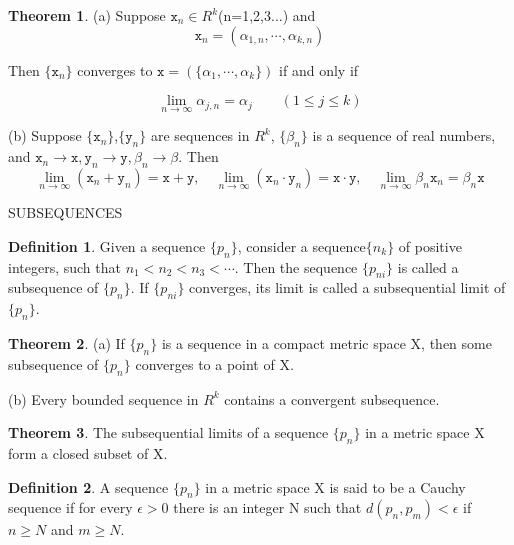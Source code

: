 \documentclass{article}
\theoremstyle{definition}
\newtheorem{defi}{Definition}
\newtheorem{theo}{Theorem}
\theoremstyle{remark}
\begin{document}
\begin{theo}
\hspace{\fill}

(a)	Suppose $\mathtt{x}_n\in R^k$(n=1,2,3...) and
	\[
	\mathtt{x}_n=(\alpha_{1,n},\cdots,\alpha_{k,n})
	\]
	
	Then $\{\mathtt{x}_n\}$ converges to $\mathtt{x}=(\{\alpha_1,\cdots,\alpha_k\})$ if and only if 
	
	\[
	\lim_{n\rightarrow\infty} \alpha_{j,n}=\alpha_j \qquad (1\le j\le k)
	\]
	
(b) 	Suppose $\{\mathtt{x}_n\}$,$\{\mathtt{y}_n\}$ are sequences in $R^k$, $\{\beta_n\}$ is a sequence of real numbers, and $\mathtt{x}_n\rightarrow \mathtt{x},\mathtt{y}_n\rightarrow \mathtt{y},\beta_n\rightarrow\beta$. Then
	\[
	\lim_{n\rightarrow\infty}(\mathtt{x}_n+\mathtt{y}_n)=\mathtt{x}+\mathtt{y},\quad
	\lim_{n\rightarrow\infty}(\mathtt{x}_n\cdot\mathtt{y}_n)=\mathtt{x}\cdot\mathtt{y},\quad
	\lim_{n\rightarrow\infty}\beta_n\mathtt{x}_n=\beta_n\mathtt{x}	
	\] 

\end{theo}

\newpage

SUBSEQUENCES

\begin{defi}
	Given a sequence $\{p_n\}$, consider a sequence$\{n_k\}$ of positive integers, such that $n_1<n_2<n_3<\cdots$. Then the sequence $\{p_{ni}\}$ is called a subsequence of $\{p_n\}$. If $\{p_{ni}\}$ converges, its limit is called a subsequential limit of $\{p_n\}$.
\end{defi}

\begin{theo}
\hspace{\fill}

	(a) If $\{p_n\}$ is a sequence in a compact metric space X, then some subsequence of $\{p_n\}$ converges to a point of X.

	(b) Every bounded sequence in $R^k$ contains a convergent subsequence.

\end{theo}

\begin{theo}
	The subsequential limits of a sequence $\{p_n\}$ in a metric space X form a closed subset of X.
\end{theo}

\newpage

\begin{defi}
	A sequence $\{p_n\}$ in a metric space X is said to be a Cauchy sequence if for every $\epsilon >0$ there is an integer N such that $d(p_n,p_m)<\epsilon$ if $n\ge N$ and $m\ge N$.
\end{defi}
\end{document}
